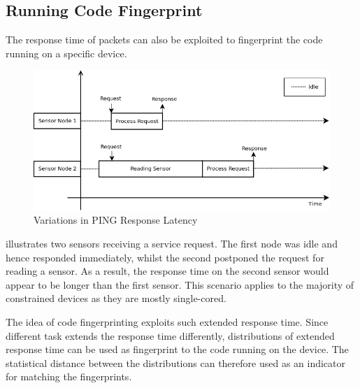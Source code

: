 \subsection{Running Code Fingerprint}
The response time of packets can also be exploited to fingerprint the code running on a specific device. 

\begin{figure}
	\center
	\includegraphics[width=\textwidth]{fig/PingProbe_Theory.png}
	\caption{Variations in PING Response Latency\label{FingerprintTheory}}
\end{figure}

 illustrates two sensors receiving a service request. The first node was idle and hence responded immediately, whilst the second postponed the request for reading a sensor. As a result, the response time on the second sensor would appear to be longer than the first sensor. This scenario applies to the majority of constrained devices as they are mostly single-cored. 

The idea of code fingerprinting exploits such extended response time. Since different task extends the response time differently, distributions of extended response time can be used as fingerprint to the code running on the device. The statistical distance between the distributions can therefore used as an indicator for matching the fingerprints.

